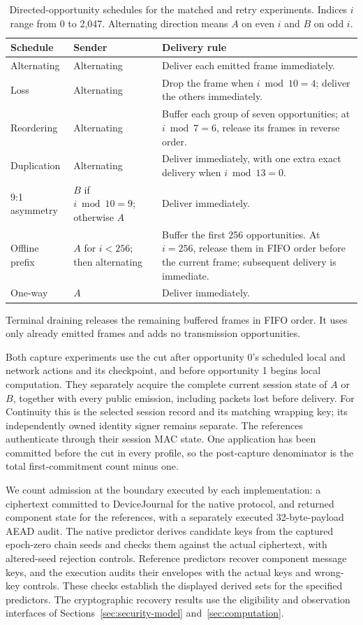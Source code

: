 \begin{table}[tb]
\caption{Directed-opportunity schedules for the matched and retry
experiments. Indices $i$ range from 0 to 2,047. Alternating direction
means $A$ on even $i$ and $B$ on odd $i$.}
\label{tab:matched-schedule-rules}
\small
\begin{tabularx}{\textwidth}{@{}L{0.18\textwidth}L{0.18\textwidth}Y@{}}
\toprule
Schedule & Sender & Delivery rule \\
\midrule
Alternating & Alternating & Deliver each emitted frame immediately. \\
Loss & Alternating & Drop the frame when $i\bmod10=4$; deliver the others immediately. \\
Reordering & Alternating & Buffer each group of seven opportunities; at $i\bmod7=6$, release its frames in reverse order. \\
Duplication & Alternating & Deliver immediately, with one extra exact delivery when $i\bmod13=0$. \\
9:1 asymmetry & $B$ if $i\bmod10=9$; otherwise $A$ & Deliver immediately. \\
Offline prefix & $A$ for $i<256$; then alternating & Buffer the first 256 opportunities. At $i=256$, release them in FIFO order before the current frame; subsequent delivery is immediate. \\
One-way & $A$ & Deliver immediately. \\
\bottomrule
\end{tabularx}

\smallskip
\parbox{\textwidth}{\small Terminal draining releases the remaining
buffered frames in FIFO order. It uses only already emitted frames and
adds no transmission opportunities.}
\end{table}

Both capture experiments use the cut after opportunity 0's scheduled
local and network actions and its checkpoint, and before opportunity 1
begins local computation. They separately acquire the complete current session
state of $A$ or $B$, together with every public emission, including packets
lost before delivery. For Continuity this is the selected session record and
its matching wrapping key; its independently owned identity signer remains
separate. The references authenticate through their session MAC state.
One application has been committed before the cut in every profile, so the
post-capture denominator is the total first-commitment count minus one.

We count admission at the boundary executed by each implementation: a
ciphertext committed to DeviceJournal for the native protocol, and returned
component state for the references, with a separately executed
32-byte-payload AEAD audit. The native predictor derives candidate keys
from the captured epoch-zero chain seeds and checks them against the actual
ciphertext, with altered-seed rejection controls. Reference predictors
recover component message keys, and the execution audits their envelopes
with the actual keys and wrong-key controls. These checks establish the
displayed derived sets for the specified predictors. The cryptographic
recovery results use the eligibility and observation interfaces of
Sections~\ref{sec:security-model} and~\ref{sec:computation}.

